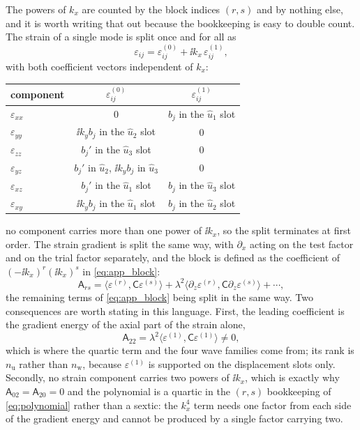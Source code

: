 The powers of $k_x$ are counted by the block indices $(r,s)$ and by nothing else,
and it is worth writing that out because the bookkeeping is easy to double count.
The strain of a single mode is split once and for all as
\begin{equation}
\label{eq:app_strain_split}
\varepsilon_{ij}=\varepsilon^{(0)}_{ij}+\ii k_x\,\varepsilon^{(1)}_{ij},
\end{equation}
with both coefficient vectors independent of $k_x$:
\begin{center}
\renewcommand{\arraystretch}{1.1}
\begin{tabular}{@{}lcc@{}}
\toprule
component & $\varepsilon^{(0)}_{ij}$ & $\varepsilon^{(1)}_{ij}$ \\
\midrule
$\varepsilon_{xx}$ & $0$ & $b_j$ in the $\widehat u_1$ slot \\
$\varepsilon_{yy}$ & $\ii k_yb_j$ in the $\widehat u_2$ slot & $0$ \\
$\varepsilon_{zz}$ & $b_j'$ in the $\widehat u_3$ slot & $0$ \\
$\varepsilon_{yz}$ & $b_j'$ in $\widehat u_2$, $\ii k_yb_j$ in $\widehat u_3$ & $0$ \\
$\varepsilon_{xz}$ & $b_j'$ in the $\widehat u_1$ slot & $b_j$ in the $\widehat u_3$ slot \\
$\varepsilon_{xy}$ & $\ii k_yb_j$ in the $\widehat u_1$ slot & $b_j$ in the $\widehat u_2$ slot \\
\bottomrule
\end{tabular}
\end{center}
no component carries more than one power of $\ii k_x$, so the split terminates at
first order.  The strain gradient is split the same way, with $\partial_x$ acting
on the test factor and on the trial factor separately, and the block is defined as
the coefficient of $(-\ii k_x)^{r}(\ii k_x)^{s}$ in \eqref{eq:app_block}:
\begin{equation}
\label{eq:app_ar_s}
\mathsf A_{rs}=\bigl\langle\varepsilon^{(r)},\mathsf C\varepsilon^{(s)}\bigr\rangle
+\lambda^{2}\bigl\langle\partial_z\varepsilon^{(r)},\mathsf C\partial_z\varepsilon^{(s)}\bigr\rangle
+\cdots ,
\end{equation}
the remaining terms of \eqref{eq:app_block} being split in the same way.  Two
consequences are worth stating in this language.  First, the leading coefficient
is the gradient energy of the axial part of the strain alone,
\begin{equation}
\label{eq:app_A22}
\mathsf A_{22}=\lambda^{2}\bigl\langle\varepsilon^{(1)},\mathsf C\varepsilon^{(1)}\bigr\rangle
\neq0 ,
\end{equation}
which is where the quartic term and the four wave families come from; its rank is
$n_{\mathrm u}$ rather than $n_{\mathrm w}$, because $\varepsilon^{(1)}$ is
supported on the displacement slots only.  Secondly, no strain component carries
two powers of $\ii k_x$, which is exactly why
$\mathsf A_{02}=\mathsf A_{20}=0$ and the polynomial is a quartic in the
$(r,s)$ bookkeeping of \eqref{eq:polynomial} rather than a sextic: the
$k_x^{4}$ term needs one factor from each side of the gradient energy and cannot
be produced by a single factor carrying two.

